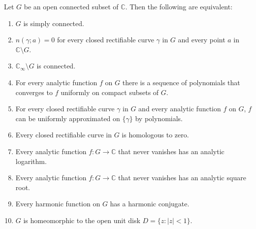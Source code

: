 Let \(G\) be an open connected subset of \(\mathbb{C}\). Then the following are equivalent:

\begin{enumerate}
\item[(a)] \(G\) is simply connected.
\item[(b)] \(n(\gamma; a) = 0\) for every closed rectifiable curve \(\gamma\) in \(G\) and every point \(a\) in \(\mathbb{C} \setminus G\).
\item[(c)] \(\mathbb{C}_{\infty} \setminus G\) is connected.
\item[(d)] For every analytic function \(f\) on \(G\) there is a sequence of polynomials that converges to \(f\) uniformly on compact subsets of \(G\).
\item[(e)] For every closed rectifiable curve \(\gamma\) in \(G\) and every analytic function \(f\) on \(G\), \(f\) can be uniformly approximated on \(\{\gamma\}\) by polynomials.
\item[(f)] Every closed rectifiable curve in \(G\) is homologous to zero.
\item[(g)] Every analytic function \(f: G \to \mathbb{C}\) that never vanishes has an analytic logarithm.
\item[(h)] Every analytic function \(f: G \to \mathbb{C}\) that never vanishes has an analytic square root.
\item[(i)] Every harmonic function on \(G\) has a harmonic conjugate.
\item[(j)] \(G\) is homeomorphic to the open unit disk \(D = \{z : |z| < 1\}\).
\end{enumerate}
